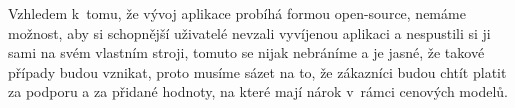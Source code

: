 \par Vzhledem k~tomu, že vývoj aplikace probíhá formou open-source, nemáme možnost, aby si schopnější uživatelé nevzali vyvíjenou aplikaci a nespustili si ji sami na svém vlastním stroji, tomuto se nijak nebráníme a je jasné, že takové případy budou vznikat, proto musíme sázet na to, že zákazníci budou chtít platit za podporu a za přidané hodnoty, na které mají nárok v~rámci cenových modelů.
